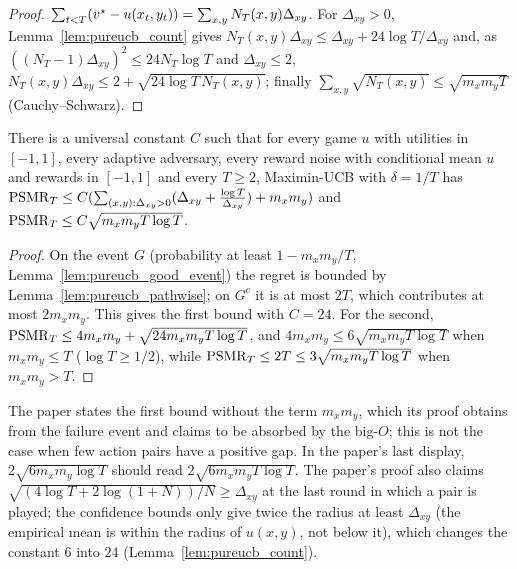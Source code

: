 \begin{proof}
  \leanok
  $\sum_{t < T} (v^\star - u(x_t, y_t)) = \sum_{x, y} N_T(x, y) \Delta_{xy}$. For $\Delta_{xy} > 0$,
  Lemma~\ref{lem:pureucb_count} gives $N_T(x, y) \Delta_{xy} \le \Delta_{xy} + 24 \log T / \Delta_{xy}$
  and, as $((N_T - 1) \Delta_{xy})^2 \le 24 N_T \log T$ and $\Delta_{xy} \le 2$,
  $N_T(x, y) \Delta_{xy} \le 2 + \sqrt{24 \log T \, N_T(x, y)}$; finally
  $\sum_{x, y} \sqrt{N_T(x, y)} \le \sqrt{m_x m_y T}$ (Cauchy--Schwarz).
\end{proof}

\begin{theorem}[Theorem 4]
  \label{thm:pureucb}
  \leanok
  There is a universal constant $C$ such that for every game $u$ with utilities in $[-1, 1]$, every
  adaptive adversary, every reward noise with conditional mean $u$ and rewards in $[-1, 1]$ and every
  $T \ge 2$, Maximin-UCB with $\delta = 1/T$ has
  $\mathrm{PSMR}_T \le C (\sum_{(x, y) : \Delta_{xy} > 0} (\Delta_{xy} + \frac{\log T}{\Delta_{xy}}) + m_x m_y)$
  and $\mathrm{PSMR}_T \le C \sqrt{m_x m_y T \log T}$.
\end{theorem}

\begin{proof}
  \leanok
  On the event $G$ (probability at least $1 - m_x m_y/T$, Lemma~\ref{lem:pureucb_good_event}) the
  regret is bounded by Lemma~\ref{lem:pureucb_pathwise}; on $G^c$ it is at most $2T$, which
  contributes at most $2 m_x m_y$. This gives the first bound with $C = 24$. For the second,
  $\mathrm{PSMR}_T \le 4 m_x m_y + \sqrt{24 m_x m_y T \log T}$, and $4 m_x m_y \le 6 \sqrt{m_x m_y T \log T}$
  when $m_x m_y \le T$ ($\log T \ge 1/2$), while $\mathrm{PSMR}_T \le 2T \le 3 \sqrt{m_x m_y T \log T}$ when
  $m_x m_y > T$.
\end{proof}

\begin{remark}
  \label{rem:pureucb_statement}
  The paper states the first bound without the term $m_x m_y$, which its proof obtains from the
  failure event and claims to be absorbed by the big-$O$; this is not the case when few action pairs
  have a positive gap. In the paper's last display, $2 \sqrt{6 m_x m_y \log T}$ should read
  $2 \sqrt{6 m_x m_y T \log T}$. The paper's proof also claims $\sqrt{(4 \log T + 2 \log(1 + N))/N}
  \ge \Delta_{xy}$ at the last round in which a pair is played; the confidence bounds only give
  twice the radius at least $\Delta_{xy}$ (the empirical mean is within the radius of $u(x, y)$, not
  below it), which changes the constant $6$ into $24$ (Lemma~\ref{lem:pureucb_count}).
\end{remark}
